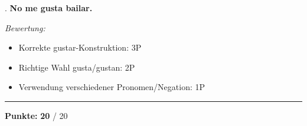 \documentclass[11pt, a4paper]{article}
\newcommand{\maxpunkte}{20}
\newcommand{\loesung}[1]{\textcolor{loesung}{\textbf{#1}}}
\begin{document}
\vspace{0.5em}
. \loesung{No me gusta bailar.}

\vspace{0.5em}
\textit{\textcolor{grau}{Bewertung:}}
\begin{itemize}
    \item Korrekte gustar-Konstruktion: 3P
    \item Richtige Wahl gusta/gustan: 2P
    \item Verwendung verschiedener Pronomen/Negation: 1P
\end{itemize}

\vspace{20pt}
\hrule
\vspace{10pt}

\begin{flushright}
\textbf{Punkte:} \loesung{\maxpunkte} / \maxpunkte
\end{flushright}
\end{document}
